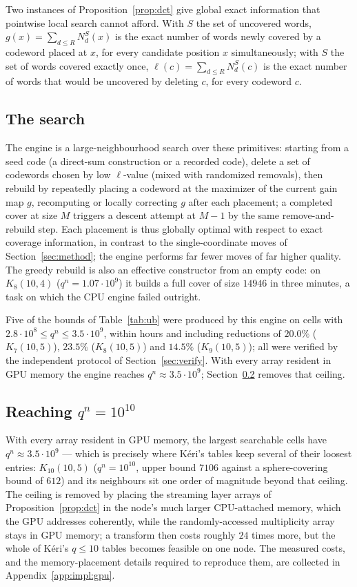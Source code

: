 \documentclass[11pt]{amsart}
\newcommand{\Kq}[3]{K_{#1}(#2,#3)}
\begin{document}
Two instances of Proposition~\ref{prop:dct} give global exact information
that pointwise local search cannot afford. With $S$ the set of uncovered
words, $g(x)=\sum_{d\le R}N_d^S(x)$ is the exact number of words newly
covered by a codeword placed at $x$, for every candidate position $x$
simultaneously; with $S$ the set of words covered exactly once,
$\ell(c)=\sum_{d\le R}N_d^S(c)$ is the exact number of words that would be
uncovered by deleting $c$, for every codeword $c$.

\subsection{The search}

The engine is a large-neighbourhood search over these primitives: starting
from a seed code (a direct-sum construction or a recorded code), delete a
set of codewords chosen by low $\ell$-value (mixed with randomized
removals), then rebuild by repeatedly placing a codeword at the maximizer
of the current gain map $g$, recomputing or locally correcting $g$ after
each placement; a completed cover at size $M$ triggers a descent attempt at
$M-1$ by the same remove-and-rebuild step. Each placement is thus globally
optimal with respect to exact coverage information, in contrast to the
single-coordinate moves of Section~\ref{sec:method}; the engine performs
far fewer moves of far higher quality. The greedy rebuild is also an
effective constructor from an empty code: on $\Kq{8}{10}{4}$
($q^n=1.07\cdot 10^9$) it builds a full cover of size $14946$ in three
minutes, a task on which the CPU engine failed outright.

Five of the bounds of Table~\ref{tab:ub} were produced by this engine on
cells with $2.8\cdot 10^8\le q^n\le 3.5\cdot 10^9$, within hours and
including reductions of $20.0\%$ ($\Kq{7}{10}{5}$), $23.5\%$
($\Kq{8}{10}{5}$) and $14.5\%$ ($\Kq{9}{10}{5}$); all were verified by the
independent protocol of Section~\ref{sec:verify}. With every array
resident in GPU memory the engine reaches $q^n\approx 3.5\cdot 10^9$;
Section~\ref{sec:gpu:hc} removes that ceiling.

\subsection{Reaching $q^n=10^{10}$}\label{sec:gpu:hc}

With every array resident in GPU memory, the largest searchable cells have
$q^n\approx 3.5\cdot 10^9$ --- which is precisely where K\'eri's tables
keep several of their loosest entries: $\Kq{10}{10}{5}$ ($q^n=10^{10}$,
upper bound $7106$ against a sphere-covering bound of $612$) and its
neighbours sit one order of magnitude beyond that ceiling. The ceiling is
removed by placing the streaming layer arrays of
Proposition~\ref{prop:dct} in the node's much larger CPU-attached memory,
which the GPU addresses coherently, while the randomly-accessed
multiplicity array stays in GPU memory; a transform then costs roughly
$24$ times more, but the whole of K\'eri's $q\le 10$ tables becomes
feasible on one node. The measured costs, and the memory-placement
details required to reproduce them, are collected in
Appendix~\ref{app:impl:gpu}.
\end{document}
